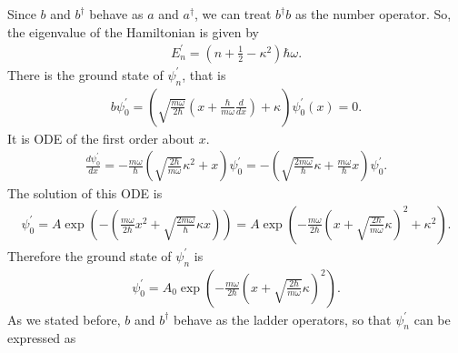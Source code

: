 \documentclass[floatfix,nofootinbib,superscriptaddress,fleqn]{revtex4-2}
\begin{document}
\begin{itemize}
    Since $b$ and $b^\dagger$ behave as 
   $a$ and $a^\dagger$, we can treat $b^\dagger b$ as
   the number operator. So, the eigenvalue of the Hamiltonian is given by 
   \begin{align}
     E_n^\prime = \left(n +\frac{1}{2} -\kappa^2\right)\hbar\omega.
   \end{align}
   There is the ground state of $\psi_n^\prime$, that is
    \begin{align}\label{eq:1-14}
      b\psi_0^\prime=
      \left(\sqrt{\frac{m\omega}{2\hbar}}\left(x+\frac{\hbar}{m\omega}
      \frac{d}{dx}\right)+\kappa\right)
      \psi_0^\prime(x)=0.
    \end{align}
    It is ODE of the first order about $x$.
    \begin{align}
      \frac{d\psi_0^\prime}{dx}
      =-\frac{m\omega}{\hbar}
      \left(
        \sqrt{\frac{2\hbar}{m\omega}}
      \kappa^2+x
      \right)
      \psi_0^\prime
      =-\left(
        \sqrt{\frac{2m\omega}{\hbar}}
        \kappa+\frac{m\omega}{\hbar}x
        \right)
        \psi_0^\prime.
    \end{align}
     The solution of this ODE is    
    \begin{align}
      \psi_0^\prime = A\exp{\left(-\left(\frac{m\omega}{2\hbar}x^2
      +\sqrt{\frac{2m\omega}{\hbar}}\kappa x\right)\right)}
      =A\exp{\left(
        -\frac{m\omega}{2\hbar}{\left(
          x +\sqrt{\frac{2\hbar}{m\omega}}\kappa
        \right)}^2+\kappa^2
      \right)}.
    \end{align}
    Therefore the ground state of $\psi_n^\prime$ is
    \begin{align}
      \psi_0^\prime = A_0
      \exp{\left(-\frac{m\omega}{2\hbar}
      {\left(x +\sqrt{\frac{2\hbar}{m\omega}}\kappa\right)}
        ^2\right)}.
    \end{align}
    As we stated before, $b$ and $b^\dagger$ behave as the ladder operators, 
    so that $\psi_n^\prime$ can be expressed as 
    \begin{align}

\end{align}
\end{itemize}
\end{document}
